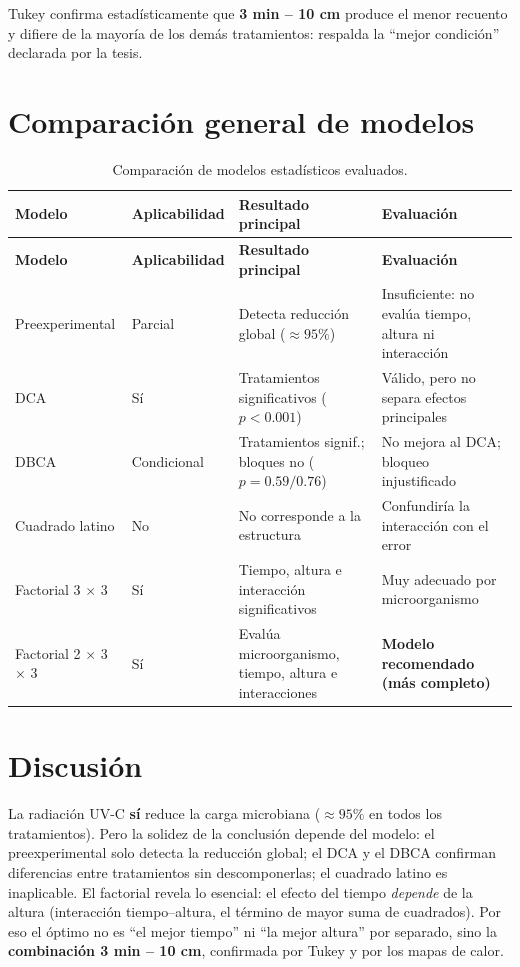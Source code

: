 \documentclass[12pt,a4paper]{article}
\begin{document}
Tukey confirma estadísticamente que \textbf{3 min -- 10 cm} produce el menor recuento y difiere de la mayoría de los demás tratamientos: respalda la ``mejor condición'' declarada por la tesis.

\section{Comparación general de modelos}

\begin{longtable}{p{3.2cm}p{2.2cm}p{4cm}p{4cm}}
\caption{Comparación de modelos estadísticos evaluados.}\\
\toprule
\textbf{Modelo} & \textbf{Aplicabilidad} & \textbf{Resultado principal} & \textbf{Evaluación}\\
\midrule
\endfirsthead
\toprule
\textbf{Modelo} & \textbf{Aplicabilidad} & \textbf{Resultado principal} & \textbf{Evaluación}\\
\midrule
\endhead
Preexperimental & Parcial & Detecta reducción global ($\approx 95\%$) & Insuficiente: no evalúa tiempo, altura ni interacción\\
DCA & Sí & Tratamientos significativos ($p<0.001$) & Válido, pero no separa efectos principales\\
DBCA & Condicional & Tratamientos signif.; bloques no ($p=0.59/0.76$) & No mejora al DCA; bloqueo injustificado\\
Cuadrado latino & No & No corresponde a la estructura & Confundiría la interacción con el error\\
Factorial 3 $\times$ 3 & Sí & Tiempo, altura e interacción significativos & Muy adecuado por microorganismo\\
Factorial 2 $\times$ 3 $\times$ 3 & Sí & Evalúa microorganismo, tiempo, altura e interacciones & \textbf{Modelo recomendado (más completo)}\\
\bottomrule
\end{longtable}

\section{Discusión}

La radiación UV-C \textbf{sí} reduce la carga microbiana ($\approx 95\%$ en todos los tratamientos). Pero la solidez de la conclusión depende del modelo: el preexperimental solo detecta la reducción global; el DCA y el DBCA confirman diferencias entre tratamientos sin descomponerlas; el cuadrado latino es inaplicable. El factorial revela lo esencial: el efecto del tiempo \emph{depende} de la altura (interacción tiempo--altura, el término de mayor suma de cuadrados). Por eso el óptimo no es ``el mejor tiempo'' ni ``la mejor altura'' por separado, sino la \textbf{combinación 3 min -- 10 cm}, confirmada por Tukey y por los mapas de calor.
\end{document}
